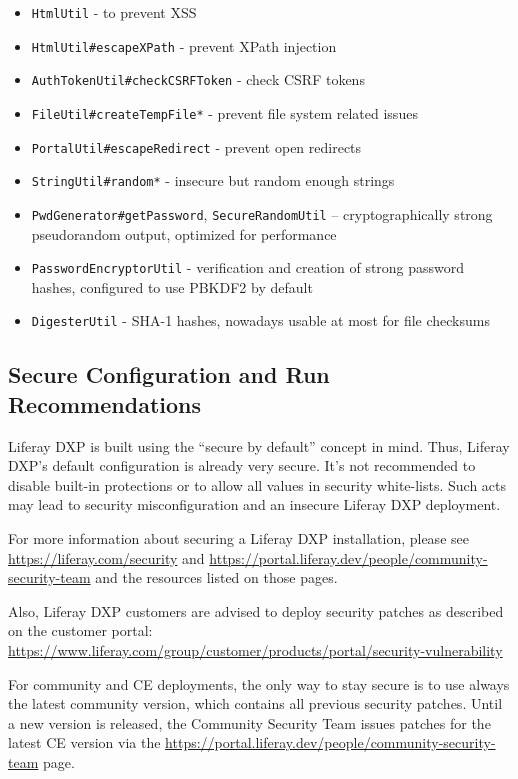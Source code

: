 \begin{itemize}
\tightlist
\item
  \texttt{HtmlUtil} - to prevent XSS
\item
  \texttt{HtmlUtil\#escapeXPath} - prevent XPath injection
\item
  \texttt{AuthTokenUtil\#checkCSRFToken} - check CSRF tokens
\item
  \texttt{FileUtil\#createTempFile*} - prevent file system related
  issues
\item
  \texttt{PortalUtil\#escapeRedirect} - prevent open redirects
\item
  \texttt{StringUtil\#random*} - insecure but random enough strings
\item
  \texttt{PwdGenerator\#getPassword}, \texttt{SecureRandomUtil} --
  cryptographically strong pseudorandom output, optimized for
  performance
\item
  \texttt{PasswordEncryptorUtil} - verification and creation of strong
  password hashes, configured to use PBKDF2 by default
\item
  \texttt{DigesterUtil} - SHA-1 hashes, nowadays usable at most for file
  checksums
\end{itemize}

\subsection{Secure Configuration and Run
Recommendations}\label{secure-configuration-and-run-recommendations}

Liferay DXP is built using the ``secure by default'' concept in mind.
Thus, Liferay DXP's default configuration is already very secure. It's
not recommended to disable built-in protections or to allow all values
in security white-lists. Such acts may lead to security misconfiguration
and an insecure Liferay DXP deployment.

For more information about securing a Liferay DXP installation, please
see \url{https://liferay.com/security} and
\url{https://portal.liferay.dev/people/community-security-team} and the
resources listed on those pages.

Also, Liferay DXP customers are advised to deploy security patches as
described on the customer portal:
\url{https://www.liferay.com/group/customer/products/portal/security-vulnerability}

For community and CE deployments, the only way to stay secure is to use
always the latest community version, which contains all previous
security patches. Until a new version is released, the Community
Security Team issues patches for the latest CE version via the
\url{https://portal.liferay.dev/people/community-security-team} page.


